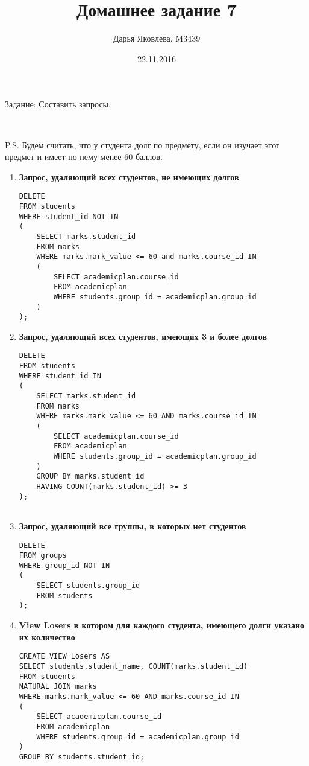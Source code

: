 \documentclass[12pt]{article}
\title{Домашнее задание 7}
\author{Дарья Яковлева, M3439}
\date{22.11.2016}
\begin{document}
\maketitle
\thispagestyle{empty}

Задание: Составить запросы.

~~~

P.S. Будем считать, что у студента долг по предмету, если он изучает этот предмет и имеет по нему менее 60 баллов. 

\begin{enumerate}	
     \item \textbf{Запрос, удаляющий всех студентов, не имеющих долгов}
\begin{lstlisting}     
DELETE
FROM students 
WHERE student_id NOT IN 
(
	SELECT marks.student_id
	FROM marks 
	WHERE marks.mark_value <= 60 and marks.course_id IN
	(
		SELECT academicplan.course_id
		FROM academicplan
		WHERE students.group_id = academicplan.group_id
    )	
);
\end{lstlisting}
     
     \item \textbf{Запрос, удаляющий всех студентов, имеющих 3 и более долгов}
     
     \begin{lstlisting}     
DELETE
FROM students 
WHERE student_id IN 
(
	SELECT marks.student_id
	FROM marks 
	WHERE marks.mark_value <= 60 AND marks.course_id IN
	(
		SELECT academicplan.course_id
		FROM academicplan
		WHERE students.group_id = academicplan.group_id
    )
    GROUP BY marks.student_id
    HAVING COUNT(marks.student_id) >= 3	
);
     
     \end{lstlisting}     
     
     \item \textbf{Запрос, удаляющий все группы, в которых нет студентов}

     \begin{lstlisting}     
DELETE
FROM groups
WHERE group_id NOT IN 
(
	SELECT students.group_id
	FROM students
);    
     \end{lstlisting}     

     \item \textbf{View Losers в котором для каждого студента, имеющего долги указано их количество}
     
     \begin{lstlisting}     
CREATE VIEW Losers AS
SELECT students.student_name, COUNT(marks.student_id)
FROM students
NATURAL JOIN marks
WHERE marks.mark_value <= 60 AND marks.course_id IN
(
	SELECT academicplan.course_id
	FROM academicplan
	WHERE students.group_id = academicplan.group_id
)	
GROUP BY students.student_id;
     

\end{lstlisting}
\end{enumerate}
\end{document}
